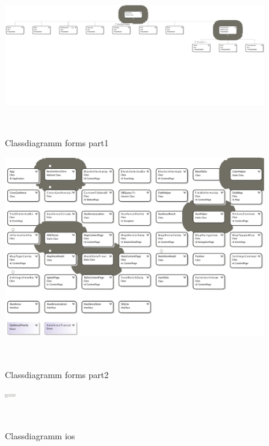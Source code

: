 \documentclass[12pt]{article}
\begin{document}
\pagestyle{empty}

  \begin{figure}[ht]

  	\begin{center}
  	
  	
  	\includegraphics[width=0.9\paperwidth, keepaspectratio=true]{ClassDiagram1-part1.pdf}
  	\caption{Classdiagramm forms part1}\label{classdiagram}\
  	\end{center}
  \end{figure}


  \begin{figure}[ht]

  	\centering
  	\includegraphics[width=0.9\paperwidth, keepaspectratio=true]{ClassDiagram1-part2.pdf}
  	\caption{Classdiagramm forms part2}\label{classdiagram}\
  \end{figure}
  
  \clearpage

  \begin{figure}[ht]

  	\centering
  	\includegraphics[width=0.9\paperwidth, keepaspectratio=true]{ClassDiagramiOS.pdf}
  	\caption{Classdiagramm ios}\label{classdiagram}\
  \end{figure}
\end{document}
